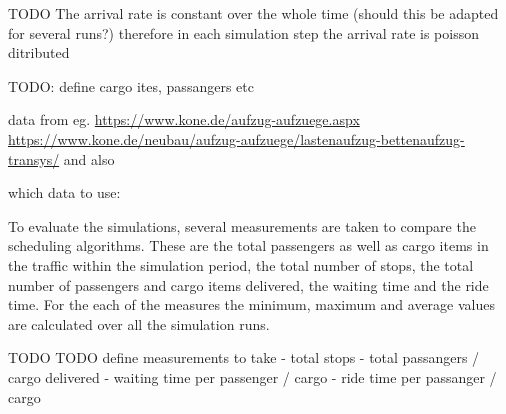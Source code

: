 TODO
The arrival rate is constant over the whole time (should this be adapted for several runs?)
therefore in each simulation step the arrival rate is poisson ditributed

TODO: define cargo ites, passangers etc

data from eg. \url{https://www.kone.de/aufzug-aufzuege.aspx} \url{https://www.kone.de/neubau/aufzug-aufzuege/lastenaufzug-bettenaufzug-transys/}
and also \autocite[][p.~349]{barney2016handbook}

which data to use: \autocite[][p.~347]{barney2016handbook}


To evaluate the simulations, several measurements are taken to compare the scheduling algorithms.
These are the total passengers as well as cargo items in the traffic within the simulation period, the total number of stops, the total number of passengers and cargo items delivered, the waiting time and the ride time.  
For the each of the measures the minimum, maximum and average values are calculated over all the simulation runs.  

TODO
TODO define measurements to take
- total stops
- total passangers / cargo delivered
- waiting time per passenger / cargo
- ride time per passanger / cargo
 

